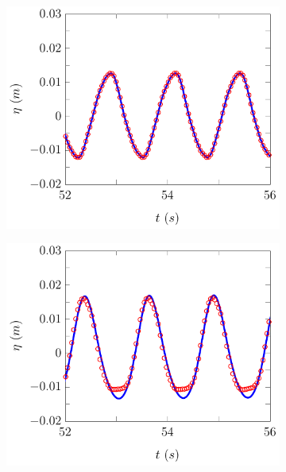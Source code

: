 \begin{figure}
	\centering
	\begin{subfigure}{0.5\textwidth}
		\includegraphics[width=\textwidth]{./chp6/figures/Experiment/Beji/sh/FEVMWG1.pdf}
		\vspace{0.5cm}
	\end{subfigure}%
	\begin{subfigure}{0.5\textwidth}
		\includegraphics[width=\textwidth]{./chp6/figures/Experiment/Beji/sh/FEVMWG2.pdf}
		\vspace{0.5cm}

\end{subfigure}
\end{figure}
